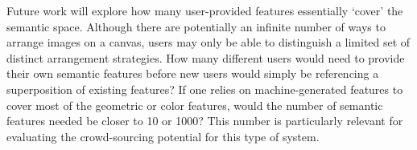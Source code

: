 \documentclass[journal]{vgtc}
\begin{document}
Future work will explore how many user-provided features essentially `cover' the semantic space.  Although there are potentially an infinite number of ways to arrange images on a canvas, users may only be able to distinguish a limited set of distinct arrangement strategies. How many different users would need to provide their own semantic features before new users would simply be referencing a superposition of existing features? If one relies on machine-generated features to cover most of the geometric or color features, would the number of semantic features needed be closer to 10 or 1000? This number is particularly relevant for evaluating the crowd-sourcing potential for this type of system.




\end{document}
